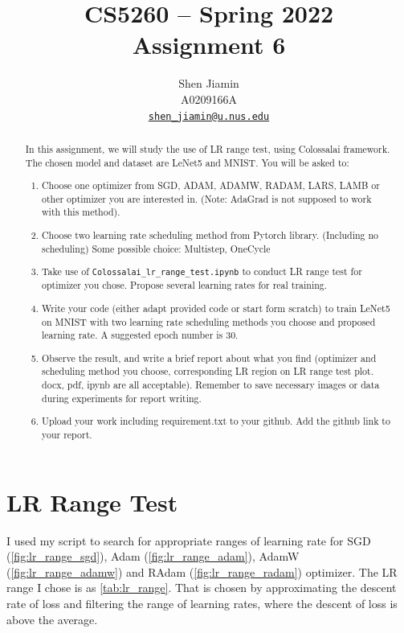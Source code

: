 \documentclass{article}
\title{\sffamily\bfseries
  CS5260 -- Spring 2022 \\
  Assignment 6
}
\author{
  Shen Jiamin \\
  A0209166A \\
  \href{mailto:shen_jiamin@u.nus.edu}{\nolinkurl{shen_jiamin@u.nus.edu}}
}
\date{}
\begin{document}
\maketitle

\begin{abstract}

    In this assignment, we will study the use of LR range test, using
    Colossalai framework. The chosen model and dataset are LeNet5 and
    MNIST. You will be asked to:
    \begin{enumerate}
        \item Choose one optimizer from SGD, ADAM, ADAMW, RADAM,
              LARS, LAMB or other optimizer you are interested in. (Note: AdaGrad
              is not supposed to work with this method).
        \item Choose two learning rate scheduling method from Pytorch library.
              (Including no scheduling) Some possible choice: Multistep, OneCycle
        \item Take use of \nolinkurl{Colossalai_lr_range_test.ipynb} to conduct LR range test
              for optimizer you chose. Propose several learning rates for real training.
        \item Write your code (either adapt provided code or start form scratch) to
              train LeNet5 on MNIST with two learning rate scheduling methods you
              choose and proposed learning rate. A suggested epoch number is 30.
        \item Observe the result, and write a brief report about what you find
              (optimizer and scheduling method you choose, corresponding LR region
              on LR range test plot. docx, pdf, ipynb are all acceptable). Remember to
              save necessary images or data during experiments for report writing.
        \item Upload your work including requirement.txt to your github. Add the
              github link to your report.
    \end{enumerate}

\end{abstract}


\section{LR Range Test}

I used my script to search for appropriate ranges of learning rate for
SGD (\autoref{fig:lr_range_sgd}),
Adam (\autoref{fig:lr_range_adam}),
AdamW (\autoref{fig:lr_range_adamw}) and
RAdam (\autoref{fig:lr_range_radam}) optimizer.
The LR range I chose is as \autoref{tab:lr_range}.
That is chosen by approximating the descent rate of loss and filtering the range of learning rates, where the descent of loss is above the average.
\end{document}
